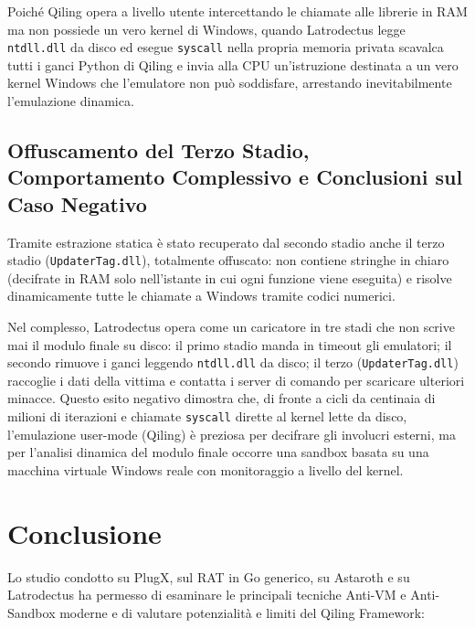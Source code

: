 \documentclass[11pt, a4paper]{article}
\begin{document}
	Poiché Qiling opera a livello utente intercettando le chiamate alle librerie in RAM ma non possiede un vero kernel di Windows, quando Latrodectus legge \texttt{ntdll.dll} da disco ed esegue \texttt{syscall} nella propria memoria privata scavalca tutti i ganci Python di Qiling e invia alla CPU un'istruzione destinata a un vero kernel Windows che l'emulatore non può soddisfare, arrestando inevitabilmente l'emulazione dinamica.
	
	\subsection{Offuscamento del Terzo Stadio, Comportamento Complessivo e Conclusioni sul Caso Negativo}
	
	Tramite estrazione statica è stato recuperato dal secondo stadio anche il terzo stadio (\texttt{UpdaterTag.dll}), totalmente offuscato: non contiene stringhe in chiaro (decifrate in RAM solo nell'istante in cui ogni funzione viene eseguita) e risolve dinamicamente tutte le chiamate a Windows tramite codici numerici.
	
	Nel complesso, Latrodectus opera come un caricatore in tre stadi che non scrive mai il modulo finale su disco: il primo stadio manda in timeout gli emulatori; il secondo rimuove i ganci leggendo \texttt{ntdll.dll} da disco; il terzo (\texttt{UpdaterTag.dll}) raccoglie i dati della vittima e contatta i server di comando per scaricare ulteriori minacce. Questo esito negativo dimostra che, di fronte a cicli da centinaia di milioni di iterazioni e chiamate \texttt{syscall} dirette al kernel lette da disco, l'emulazione user-mode (Qiling) è preziosa per decifrare gli involucri esterni, ma per l'analisi dinamica del modulo finale occorre una sandbox basata su una macchina virtuale Windows reale con monitoraggio a livello del kernel.
	
	\section{Conclusione}
	
	Lo studio condotto su PlugX, sul RAT in Go generico, su Astaroth e su Latrodectus ha permesso di esaminare le principali tecniche Anti-VM e Anti-Sandbox moderne e di valutare potenzialità e limiti del Qiling Framework:
	
\end{document}
